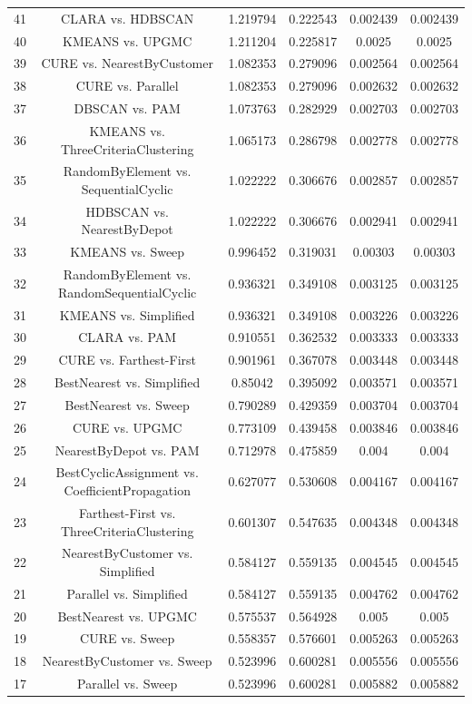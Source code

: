 \documentclass[a4paper,10pt]{article}
\begin{document}
\begin{landscape}
\begin{table}[!htp]
\begin{tabular}{cccccc}
41&CLARA vs. HDBSCAN&1.219794&0.222543&0.002439&0.002439\\
40&KMEANS vs. UPGMC&1.211204&0.225817&0.0025&0.0025\\
39&CURE vs. NearestByCustomer&1.082353&0.279096&0.002564&0.002564\\
38&CURE vs. Parallel&1.082353&0.279096&0.002632&0.002632\\
37&DBSCAN vs. PAM&1.073763&0.282929&0.002703&0.002703\\
36&KMEANS vs. ThreeCriteriaClustering&1.065173&0.286798&0.002778&0.002778\\
35&RandomByElement vs. SequentialCyclic&1.022222&0.306676&0.002857&0.002857\\
34&HDBSCAN vs. NearestByDepot&1.022222&0.306676&0.002941&0.002941\\
33&KMEANS vs. Sweep&0.996452&0.319031&0.00303&0.00303\\
32&RandomByElement vs. RandomSequentialCyclic&0.936321&0.349108&0.003125&0.003125\\
31&KMEANS vs. Simplified&0.936321&0.349108&0.003226&0.003226\\
30&CLARA vs. PAM&0.910551&0.362532&0.003333&0.003333\\
29&CURE vs. Farthest-First&0.901961&0.367078&0.003448&0.003448\\
28&BestNearest vs. Simplified&0.85042&0.395092&0.003571&0.003571\\
27&BestNearest vs. Sweep&0.790289&0.429359&0.003704&0.003704\\
26&CURE vs. UPGMC&0.773109&0.439458&0.003846&0.003846\\
25&NearestByDepot vs. PAM&0.712978&0.475859&0.004&0.004\\
24&BestCyclicAssignment vs. CoefficientPropagation&0.627077&0.530608&0.004167&0.004167\\
23&Farthest-First vs. ThreeCriteriaClustering&0.601307&0.547635&0.004348&0.004348\\
22&NearestByCustomer vs. Simplified&0.584127&0.559135&0.004545&0.004545\\
21&Parallel vs. Simplified&0.584127&0.559135&0.004762&0.004762\\
20&BestNearest vs. UPGMC&0.575537&0.564928&0.005&0.005\\
19&CURE vs. Sweep&0.558357&0.576601&0.005263&0.005263\\
18&NearestByCustomer vs. Sweep&0.523996&0.600281&0.005556&0.005556\\
17&Parallel vs. Sweep&0.523996&0.600281&0.005882&0.005882\\

\end{tabular}
\end{table}
\end{landscape}
\end{document}

